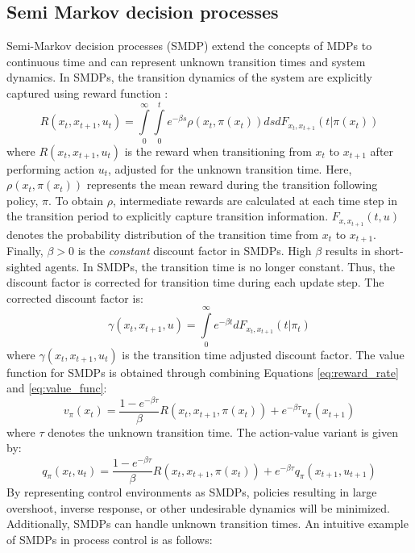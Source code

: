 \subsection{Semi Markov decision processes}
Semi-Markov decision processes (SMDP) extend the concepts of MDPs to continuous time and can represent unknown transition times and system dynamics. In SMDPs, the transition dynamics of the system are explicitly captured using reward function \cite{continuous_rl_ref14}:
\begin{equation}
R(x_t, x_{t+1}, u_t) = \int\limits^\infty_0 \int\limits^t_0 e^{-\beta s} \rho(x_t, \pi (x_t))dsdF_{x_t, x_{t+1}}(t | \pi (x_t))
\label{eq:reward_rate}    
\end{equation}
where $R(x_t, x_{t+1}, u_t)$ is the reward when transitioning from $x_t$ to $x_{t+1}$ after performing action $u_t$, adjusted for the unknown transition time. Here, $\rho(x_t, \pi(x_t))$ represents the mean reward during the transition following policy, $\pi$. To obtain $\rho$, intermediate rewards are calculated at each time step in the transition period to explicitly capture transition information. $F_{x, x_{t+1}}(t, u)$ denotes the probability distribution of the transition time from $x_t$ to $x_{t+1}$.  Finally, $\beta > 0$ is the \textit{constant} discount factor in SMDPs. High $\beta$ results in short-sighted agents. In SMDPs, the transition time is no longer constant.  Thus, the discount factor is corrected for transition time during each update step.  The corrected discount factor is:
\begin{equation}
    \gamma(x_t, x_{t+1}, u) = \int\limits^{\infty}_0 e^{-\beta t} dF_{x_t, x_{t+1}}(t | \pi_t)
\end{equation}
where $\gamma (x_t, x_{t+1}, u_t)$ is the transition time adjusted discount factor. The value function for SMDPs is obtained through combining Equations \ref{eq:reward_rate} and \ref{eq:value_func}:
\begin{equation}
v_{\pi}(x_t) = \frac{1 - e^{-\beta \tau}}{\beta} R(x_t, x_{t+1}, \pi(x_t)) + e^{-\beta \tau}v_{\pi}(x_{t+1})
\end{equation}
where $\tau$ denotes the unknown transition time. The action-value variant is given by:
\begin{equation}
    q_{\pi}(x_t, u_t) = \frac{1 - e^{-\beta \tau}}{\beta} R(x_t, x_{t+1}, \pi(x_t)) + e^{-\beta \tau}  q_{\pi}(x_{t+1}, u_{t+1})
\end{equation}
By representing control environments as SMDPs, policies resulting in large overshoot, inverse response, or other undesirable dynamics will be minimized. Additionally, SMDPs can handle unknown transition times.  An intuitive example of SMDPs in process control is as follows:

